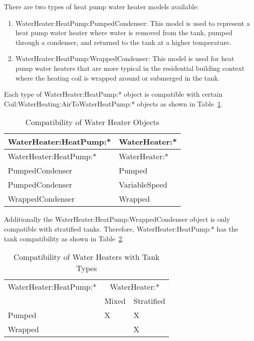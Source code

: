 There are two types of heat pump water heater models available:

\begin{enumerate}
\def\labelenumi{\arabic{enumi}.}
\tightlist
\item WaterHeater:HeatPump:PumpedCondenser: This model is used to represent a heat pump water heater where water is removed from the tank, pumped through a condenser, and returned to the tank at a higher temperature.
\item WaterHeater:HeatPump:WrappedCondenser: This model is used for heat pump water heaters that are more typical in the residential building context where the heating coil is wrapped around or submerged in the tank.
\end{enumerate}

Each type of WaterHeater:HeatPump:* object is compatible with certain Coil:WaterHeating:AirToWaterHeatPump:* objects as shown in Table~\ref{table:compatibility-of-water-heater-objects}.

\begin{longtable}[c]{@{}ll@{}}
\caption{Compatibility of Water Heater Objects \label{table:compatibility-of-water-heater-objects}} \tabularnewline
\toprule 
WaterHeater:HeatPump:* & WaterHeater:* \tabularnewline
\midrule
\endfirsthead

\toprule 
WaterHeater:HeatPump:* & WaterHeater:* \tabularnewline
\midrule
\endhead

PumpedCondenser & Pumped \tabularnewline
PumpedCondenser & VariableSpeed \tabularnewline
WrappedCondenser & Wrapped \tabularnewline
\bottomrule
\end{longtable}

Additionally the WaterHeater:HeatPump:WrappedCondenser object is only compatible with stratified tanks. Therefore, WaterHeater:HeatPump:* has the tank compatibility as shown in Table~\ref{table:compatibility-of-water-heaters-with-tank-types}.

\begin{longtable}[c]{@{}lll@{}}
\caption{Compatibility of Water Heaters with Tank Types \label{table:compatibility-of-water-heaters-with-tank-types}} \tabularnewline
\toprule
WaterHeater:HeatPump:* & \multicolumn{2}{c}{WaterHeater:*} \tabularnewline
\cmidrule{2-3}
& Mixed & Stratified \tabularnewline
\midrule
\endhead

Pumped & X & X \tabularnewline
Wrapped &  & X \tabularnewline
\bottomrule
\end{longtable}

